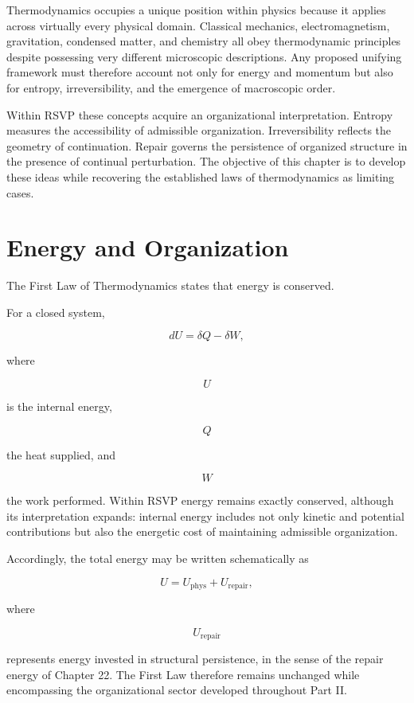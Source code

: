 \documentclass[11pt,oneside]{book}
\numberwithin{equation}{chapter}
\theoremstyle{definition}
\theoremstyle{plain}
\begin{document}
Thermodynamics occupies a unique position within physics because it applies
across virtually every physical domain. Classical mechanics,
electromagnetism, gravitation, condensed matter, and chemistry all obey
thermodynamic principles despite possessing very different microscopic
descriptions. Any proposed unifying framework must therefore account not
only for energy and momentum but also for entropy, irreversibility, and the
emergence of macroscopic order.

Within RSVP these concepts acquire an organizational interpretation. Entropy
measures the accessibility of admissible organization. Irreversibility
reflects the geometry of continuation. Repair governs the persistence of
organized structure in the presence of continual perturbation. The
objective of this chapter is to develop these ideas while recovering the
established laws of thermodynamics as limiting cases.

\section{Energy and Organization}

The First Law of Thermodynamics states that energy is conserved.

For a closed system,

\[
dU
=
\delta Q
-
\delta W,
\]

where

\[
U
\]

is the internal energy,

\[
Q
\]

the heat supplied, and

\[
W
\]

the work performed. Within RSVP energy remains exactly conserved, although its interpretation expands: internal energy includes not only kinetic and potential contributions but also the energetic cost of maintaining admissible organization.

Accordingly, the total energy may be written schematically as

\[
U
=
U_{\mathrm{phys}}
+
U_{\mathrm{repair}},
\]

where

\[
U_{\mathrm{repair}}
\]

represents energy invested in structural persistence, in the sense of the repair energy of Chapter 22. The First Law therefore remains unchanged while encompassing the organizational sector developed throughout Part II.
\end{document}
